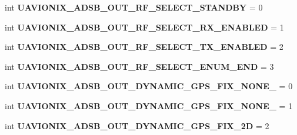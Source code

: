 \begin{DoxyCompactItemize}
\mbox{\label{namespacepymavlink_1_1dialects_1_1v10_ae99d5dee1e4170be85e91ddd1fdec3dd}} 
int {\bfseries U\+A\+V\+I\+O\+N\+I\+X\+\_\+\+A\+D\+S\+B\+\_\+\+O\+U\+T\+\_\+\+R\+F\+\_\+\+S\+E\+L\+E\+C\+T\+\_\+\+S\+T\+A\+N\+D\+BY} = 0
\item 
\mbox{\label{namespacepymavlink_1_1dialects_1_1v10_ad946d52a45a5de0b352ed3468b5da548}} 
int {\bfseries U\+A\+V\+I\+O\+N\+I\+X\+\_\+\+A\+D\+S\+B\+\_\+\+O\+U\+T\+\_\+\+R\+F\+\_\+\+S\+E\+L\+E\+C\+T\+\_\+\+R\+X\+\_\+\+E\+N\+A\+B\+L\+ED} = 1
\item 
\mbox{\label{namespacepymavlink_1_1dialects_1_1v10_a07a4889791693c2e834aad8abe1a785c}} 
int {\bfseries U\+A\+V\+I\+O\+N\+I\+X\+\_\+\+A\+D\+S\+B\+\_\+\+O\+U\+T\+\_\+\+R\+F\+\_\+\+S\+E\+L\+E\+C\+T\+\_\+\+T\+X\+\_\+\+E\+N\+A\+B\+L\+ED} = 2
\item 
\mbox{\label{namespacepymavlink_1_1dialects_1_1v10_a52190fa9ea12916dce2bec78c3db2e86}} 
int {\bfseries U\+A\+V\+I\+O\+N\+I\+X\+\_\+\+A\+D\+S\+B\+\_\+\+O\+U\+T\+\_\+\+R\+F\+\_\+\+S\+E\+L\+E\+C\+T\+\_\+\+E\+N\+U\+M\+\_\+\+E\+ND} = 3
\item 
\mbox{\label{namespacepymavlink_1_1dialects_1_1v10_a438ad6092266ee8f2043acc8ac3f83df}} 
int {\bfseries U\+A\+V\+I\+O\+N\+I\+X\+\_\+\+A\+D\+S\+B\+\_\+\+O\+U\+T\+\_\+\+D\+Y\+N\+A\+M\+I\+C\+\_\+\+G\+P\+S\+\_\+\+F\+I\+X\+\_\+\+N\+O\+N\+E\+\_} = 0
\item 
\mbox{\label{namespacepymavlink_1_1dialects_1_1v10_ab8537e2c0e2c7d1012408cb1e550c5ac}} 
int {\bfseries U\+A\+V\+I\+O\+N\+I\+X\+\_\+\+A\+D\+S\+B\+\_\+\+O\+U\+T\+\_\+\+D\+Y\+N\+A\+M\+I\+C\+\_\+\+G\+P\+S\+\_\+\+F\+I\+X\+\_\+\+N\+O\+N\+E\+\_} = 1
\item 
\mbox{\label{namespacepymavlink_1_1dialects_1_1v10_a926cef720d41f451b0e5143a4f4a77e5}} 
int {\bfseries U\+A\+V\+I\+O\+N\+I\+X\+\_\+\+A\+D\+S\+B\+\_\+\+O\+U\+T\+\_\+\+D\+Y\+N\+A\+M\+I\+C\+\_\+\+G\+P\+S\+\_\+\+F\+I\+X\+\_\+2D} = 2
\item 
\mbox{\label{namespacepymavlink_1_1dialects_1_1v10_a209a515bd5faf8395d9a5cdd6c1e4960}} 

\end{DoxyCompactItemize}
